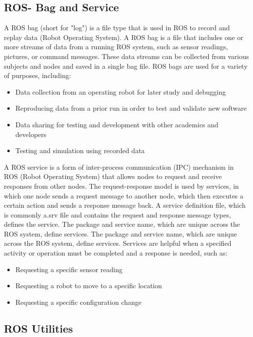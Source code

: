 \documentclass[11pt, a4paper, openany]{book}
\begin{document}
\subsection{ROS- Bag and Service}
A ROS bag (short for "log") is a file type that is used in ROS to record and replay data (Robot Operating System). A ROS bag is a file that includes one or more streams of data from a running ROS system, such as sensor readings, pictures, or command messages. These data streams can be collected from various subjects and nodes and saved in a single bag file.
ROS bags are used for a variety of purposes, including:
\begin{itemize}
    \item Data collection from an operating robot for later study and debugging
    \item Reproducing data from a prior run in order to test and validate new software
    \item Data sharing for testing and development with other academics and developers
    \item Testing and simulation using recorded data
\end{itemize}
A ROS service is a form of inter-process communication (IPC) mechanism in ROS (Robot Operating System) that allows nodes to request and receive responses from other nodes. The request-response model is used by services, in which one node sends a request message to another node, which then executes a certain action and sends a response message back.
\newline
A service definition file, which is commonly a.srv file and contains the request and response message types, defines the service. The package and service name, which are unique across the ROS system, define services. The package and service name, which are unique across the ROS system, define services.
Services are helpful when a specified activity or operation must be completed and a response is needed, such as:
\begin{itemize}
\item Requesting a specific sensor reading
\item Requesting a robot to move to a specific location
\item Requesting a specific configuration change
\end{itemize}
 \subsection{ ROS Utilities}
\end{document}
